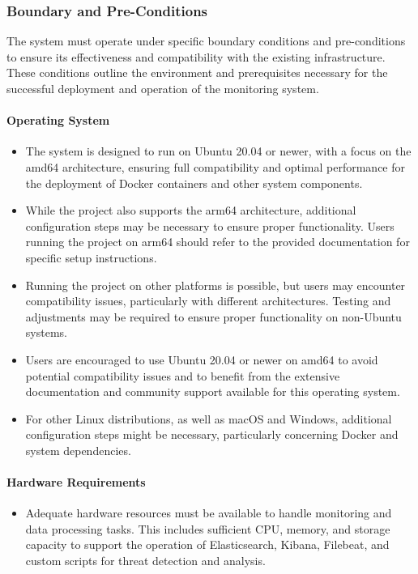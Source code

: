 \documentclass{article}
\begin{document}
    \subsubsection{Boundary and Pre-Conditions}\label{subsubsec:boundary-preconditions}

    The system must operate under specific boundary conditions and pre-conditions to ensure its effectiveness and compatibility with the existing infrastructure.
    These conditions outline the environment and prerequisites necessary for the successful deployment and operation of the monitoring system.

    \paragraph{Operating System}
\begin{itemize}
\item The system is designed to run on Ubuntu 20.04 or newer, with a focus on the amd64 architecture, ensuring full compatibility and optimal performance for the deployment of Docker containers and other system components.
\item While the project also supports the arm64 architecture, additional configuration steps may be necessary to ensure proper functionality. Users running the project on arm64 should refer to the provided documentation for specific setup instructions.
\item Running the project on other platforms is possible, but users may encounter compatibility issues, particularly with different architectures. Testing and adjustments may be required to ensure proper functionality on non-Ubuntu systems.
\item Users are encouraged to use Ubuntu 20.04 or newer on amd64 to avoid potential compatibility issues and to benefit from the extensive documentation and community support available for this operating system.
\item For other Linux distributions, as well as macOS and Windows, additional configuration steps might be necessary, particularly concerning Docker and system dependencies.
\end{itemize}

    \paragraph{Hardware Requirements}
    \begin{itemize}
        \item Adequate hardware resources must be available to handle monitoring and data processing tasks.
        This includes sufficient CPU, memory, and storage capacity to support the operation of Elasticsearch, Kibana, Filebeat, and custom scripts for threat detection and analysis.
    \end{itemize}
\end{document}
